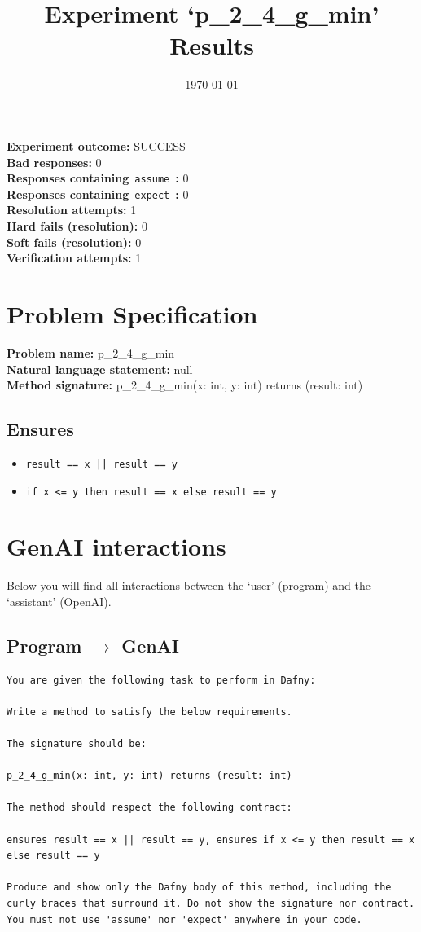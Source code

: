 \documentclass{article}
\begin{document}
\title{Experiment `p\_2\_4\_g\_min' Results}
\author{\today}
\date{}
\maketitle
\textbf{Experiment outcome: }SUCCESS
\\\textbf{Bad responses: }0
\\\textbf{Responses containing}~\texttt{assume}~\textbf{: }0
\\\textbf{Responses containing}~\texttt{expect}~\textbf{: }0
\\\textbf{Resolution attempts: }1
\\\textbf{Hard fails (resolution): }0
\\\textbf{Soft fails (resolution): }0
\\\textbf{Verification attempts: }1
\section*{Problem Specification}
\textbf{Problem name: }p\_2\_4\_g\_min
\\\textbf{Natural language statement: }null
\\\textbf{Method signature: }p\_2\_4\_g\_min(x: int, y: int) returns (result: int)
\subsection*{Ensures}
\begin{itemize}
\item \texttt{result == x || result == y}
\item \texttt{if x <= y then result == x else result == y}
\end{itemize}
\clearpage
\section*{GenAI interactions}
Below you will find all interactions between the `user' (program) and the `assistant' (OpenAI).
\subsection*{Program $\rightarrow$ GenAI}
\begin{lstlisting}
You are given the following task to perform in Dafny:

Write a method to satisfy the below requirements.

The signature should be:

p_2_4_g_min(x: int, y: int) returns (result: int)

The method should respect the following contract:

ensures result == x || result == y, ensures if x <= y then result == x else result == y

Produce and show only the Dafny body of this method, including the curly braces that surround it. Do not show the signature nor contract. You must not use 'assume' nor 'expect' anywhere in your code.
\end{lstlisting}
\end{document}
